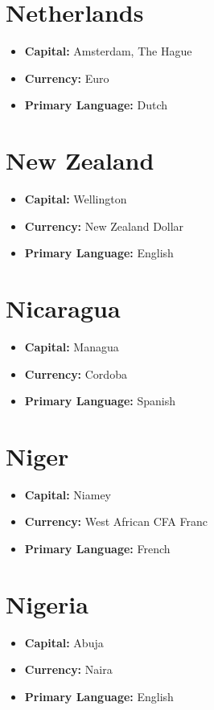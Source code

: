 \documentclass[a4paper,100pt,twoside]{book}
\begin{document}
\section*{\Huge Netherlands}
\vspace{5mm} %
\begin{itemize}
	\item \textbf{Capital:} Amsterdam, The Hague
	\item \textbf{Currency:} Euro
	\item \textbf{Primary Language:} Dutch
\end{itemize}

\section*{\Huge New Zealand}
\vspace{5mm} %
\begin{itemize}
	\item \textbf{Capital:} Wellington
	\item \textbf{Currency:} New Zealand Dollar
	\item \textbf{Primary Language:} English
\end{itemize}

\section*{\Huge Nicaragua}
\vspace{5mm} %
\begin{itemize}
	\item \textbf{Capital:} Managua
	\item \textbf{Currency:} Cordoba
	\item \textbf{Primary Language:} Spanish
\end{itemize}

\section*{\Huge Niger}
\vspace{5mm} %
\begin{itemize}
	\item \textbf{Capital:} Niamey
	\item \textbf{Currency:} West African CFA Franc
	\item \textbf{Primary Language:} French
\end{itemize}

\section*{\Huge Nigeria}
\vspace{5mm} %
\begin{itemize}
	\item \textbf{Capital:} Abuja
	\item \textbf{Currency:} Naira
	\item \textbf{Primary Language:} English
\end{itemize}
\end{document}
